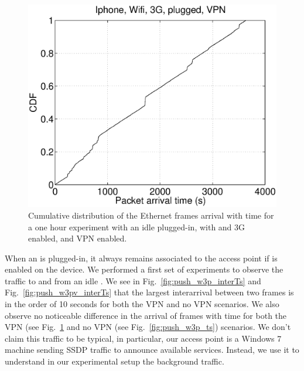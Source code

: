 \begin{figure}
\centering
        \includegraphics[width=0.8\linewidth]{../../code/pushNotification/Fig/bw_iphone_wifi_3g_plug_vpn_ts.eps}
  \caption{Cumulative distribution of the Ethernet frames
          arrival with time for a one hour experiment with an idle
          \iphone{} plugged-in, with \wifi{} and 3G enabled, and VPN
          enabled.}
  \label{fig:push_w3pv_ts}
\end{figure}

When an \iphone{} is plugged-in, it always remains associated to the
\wifi{} access point if \wifi{} is enabled on the device. We performed
a first set of experiments to observe the traffic to and from an idle
\iphone{}. We see in Fig.~\ref{fig:push_w3p_interTs} and
Fig.~\ref{fig:push_w3pv_interTs} that the largest interarrival between
two frames is in the order of 10 seconds for both the VPN and no VPN
scenarios. We also observe no noticeable difference in the arrival of
frames with time for both the VPN (see Fig.~\ref{fig:push_w3pv_ts} and
no VPN (see Fig.~\ref{fig:push_w3p_ts}) scenarios. We don't claim this
traffic to be typical, in particular, our access point is a Windows 7
machine sending SSDP traffic to announce available services. Instead,
we use it to understand in our experimental setup the background
traffic.





